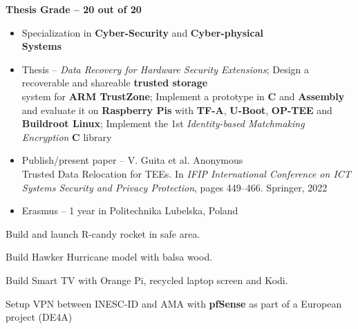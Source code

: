 \documentclass[10pt,a4paper,ragged2e,withhyper]{altacv}
\begin{document}
\begin{paracol}{2}
\faGraduationCap \hspace{0.05cm} \textbf{Thesis Grade -- 20 out of 20}
\begin{itemize}
\item Specialization in \textbf{Cyber-Security} and \textbf{Cyber-physical\\ Systems}
\item Thesis -- \emph{Data Recovery for Hardware Security Extensions}; Design a recoverable and shareable \textbf{trusted storage} \\ system for \textbf{ARM TrustZone};
Implement a prototype in \textbf{C} and \textbf{Assembly} and evaluate it on \textbf{Raspberry Pis} with \textbf{TF-A}, \textbf{U-Boot}, \textbf{OP-TEE} and \textbf{Buildroot Linux};
Implement the 1st \emph{Identity-based Matchmaking Encryption} \textbf{C} library
\item Publish/present paper -- V. Guita et al. Anonymous\\ Trusted Data Relocation for TEEs. In \emph{IFIP International Conference on ICT Systems Security and Privacy Protection}, pages 449–466. Springer, 2022
\item Erasmus -- 1 year in Politechnika Lubelska, Poland
\end{itemize}

\medskip


\smallskip
{}
\smallskip
{}
\smallskip
{}
\smallskip
{}

\medskip


\small Build and launch R-candy rocket in safe area.

\medskip

\small Build Hawker Hurricane model with balsa wood.

\medskip

\small Build Smart TV with Orange Pi, recycled laptop screen and Kodi.


\small Setup VPN between INESC-ID and AMA with \textbf{pfSense} as part of a European project (DE4A)


\end{paracol}
\end{document}
